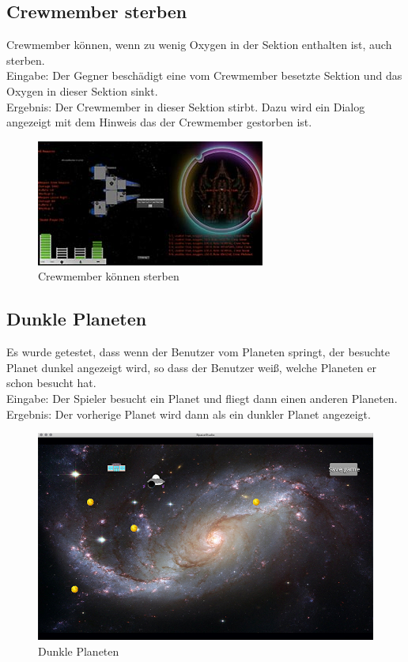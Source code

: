\documentclass[12pt]{article}
\begin{document}
\subsection{Crewmember sterben}
Crewmember können, wenn zu wenig Oxygen in der Sektion enthalten ist, auch sterben.\\
Eingabe: Der Gegner beschädigt eine vom Crewmember besetzte Sektion und das Oxygen in dieser Sektion sinkt.\\
Ergebnis: Der Crewmember in dieser Sektion stirbt. Dazu wird ein Dialog angezeigt mit dem Hinweis das der Crewmember gestorben ist.\\
\begin{figure}[htp]
	\centering
	\includegraphics[scale=1.5]{TestProtocolBilder/crewMemberDead@0,25x.jpg}
	\caption{Crewmember können sterben}
\end{figure}
\newpage
\subsection{Dunkle Planeten}
Es wurde getestet, dass wenn der Benutzer vom Planeten springt, der besuchte Planet dunkel angezeigt wird, so dass der Benutzer weiß, welche Planeten er schon besucht hat.\\
Eingabe: Der Spieler besucht ein Planet und fliegt dann einen anderen Planeten.\\
Ergebnis: Der vorherige Planet wird dann als ein dunkler Planet angezeigt.\\
\begin{figure}[htp]
\centering
\includegraphics[scale=0.6]{TestProtocolBilder/besuchtePlanet.jpg}
\caption{Dunkle Planeten}
\end{figure}
\newpage
\end{document}
